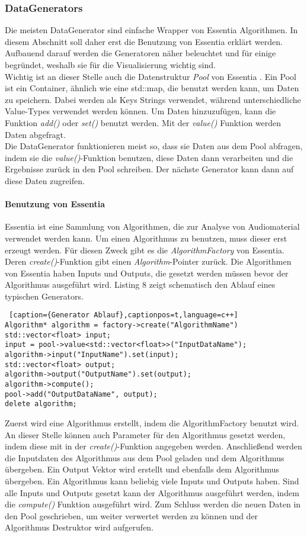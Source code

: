 \documentclass[11pt,a4paper]{article}
\begin{document}
\subsubsection{DataGenerators}
Die meisten DataGenerator sind einfache Wrapper von Essentia Algorithmen. In diesem Abschnitt soll daher erst die Benutzung von Essentia erklärt werden. Aufbauend darauf werden die Generatoren näher beleuchtet und für einige begründet, weshalb sie für die Visualisierung wichtig sind.\\
Wichtig ist an dieser Stelle auch die Datenstruktur \textit{Pool} von Essentia \cite{EssentiaPool}. Ein Pool ist ein Container, ähnlich wie eine std::map, die benutzt werden kann, um Daten zu speichern. Dabei werden als Keys Strings verwendet, während unterschiedliche Value-Types verwendet werden können. Um Daten hinzuzufügen, kann die Funktion \textit{add()} oder \textit{set()} benutzt werden. Mit der \textit{value()} Funktion werden Daten abgefragt.\\
Die DataGenerator funktionieren meist so, dass sie Daten aus dem Pool abfragen, indem sie die \textit{value()}-Funktion benutzen, diese Daten dann verarbeiten und die Ergebnisse zurück in den Pool schreiben. Der nächste Generator kann dann auf diese Daten zugreifen.
\paragraph{Benutzung von Essentia}
Essentia ist eine Sammlung von Algorithmen, die zur Analyse von Audiomaterial verwendet werden kann. Um einen Algorithmus zu benutzen, muss dieser erst erzeugt werden. Für diesen Zweck gibt es die \textit{AlgorithmFactory} von Essentia. Deren \textit{create()}-Funktion gibt einen \textit{Algorithm}-Pointer zurück. Die Algorithmen von Essentia haben Inputs und Outputs, die gesetzt werden müssen bevor der Algorithmus ausgeführt wird. Listing 8 zeigt schematisch den Ablauf eines typischen Generators.
\begin{lstlisting} [caption={Generator Ablauf},captionpos=t,language=c++]
Algorithm* algorithm = factory->create("AlgorithmName")
std::vector<float> input;
input = pool->value<std::vector<float>>("InputDataName");
algorithm->input("InputName").set(input);
std::vector<float> output;
algorithm->output("OutputName").set(output);
algorithm->compute();
pool->add("OutputDataName", output);
delete algorithm;
\end{lstlisting}
\noindent
Zuerst wird eine Algorithmus erstellt, indem die AlgorithmFactory benutzt wird. An dieser Stelle können auch Parameter für den Algorithmus gesetzt werden, indem diese mit in der \textit{create()}-Funktion angegeben werden. Anschließend werden die Inputdaten des Algorithmus aus dem Pool geladen und dem Algorithmus übergeben. Ein Output Vektor wird erstellt und ebenfalls dem Algorithmus übergeben. Ein Algorithmus kann beliebig viele Inputs und Outputs haben. Sind alle Inputs und Outputs gesetzt kann der Algorithmus ausgeführt werden, indem die \textit{compute()} Funktion ausgeführt wird. Zum Schluss werden die neuen Daten in den Pool geschrieben, um weiter verwertet werden zu können und der Algorithmus Destruktor wird aufgerufen.
\end{document}
